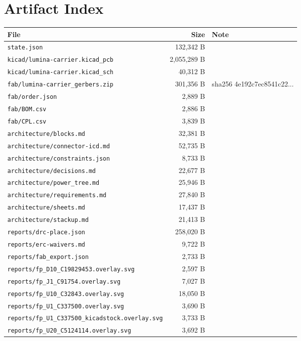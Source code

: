 \documentclass[11pt,a4paper]{article}
\begin{document}
\section{Artifact Index}
{\small
\begin{longtable}{p{9cm}rp{4cm}}
\toprule
\textbf{File} & \textbf{Size} & \textbf{Note} \\
\midrule
\endhead
\texttt{state.json} & 132,342 B &  \\
\texttt{kicad/lumina-carrier.kicad\_pcb} & 2,055,289 B &  \\
\texttt{kicad/lumina-carrier.kicad\_sch} & 40,312 B &  \\
\texttt{fab/lumina-carrier\_gerbers.zip} & 301,356 B & sha256 4e192c7ec8541c22... \\
\texttt{fab/order.json} & 2,889 B &  \\
\texttt{fab/BOM.csv} & 2,886 B &  \\
\texttt{fab/CPL.csv} & 3,839 B &  \\
\texttt{architecture/blocks.md} & 32,381 B &  \\
\texttt{architecture/connector-icd.md} & 52,735 B &  \\
\texttt{architecture/constraints.json} & 8,733 B &  \\
\texttt{architecture/decisions.md} & 22,677 B &  \\
\texttt{architecture/power\_tree.md} & 25,946 B &  \\
\texttt{architecture/requirements.md} & 27,840 B &  \\
\texttt{architecture/sheets.md} & 17,437 B &  \\
\texttt{architecture/stackup.md} & 21,413 B &  \\
\texttt{reports/drc-place.json} & 258,020 B &  \\
\texttt{reports/erc-waivers.md} & 9,722 B &  \\
\texttt{reports/fab\_export.json} & 2,733 B &  \\
\texttt{reports/fp\_D10\_C19829453.overlay.svg} & 2,597 B &  \\
\texttt{reports/fp\_J1\_C91754.overlay.svg} & 7,027 B &  \\
\texttt{reports/fp\_U10\_C32843.overlay.svg} & 18,050 B &  \\
\texttt{reports/fp\_U1\_C337500.overlay.svg} & 3,690 B &  \\
\texttt{reports/fp\_U1\_C337500\_kicadstock.overlay.svg} & 3,733 B &  \\
\texttt{reports/fp\_U20\_C5124114.overlay.svg} & 3,692 B &  \\

\end{longtable}}
\end{document}
